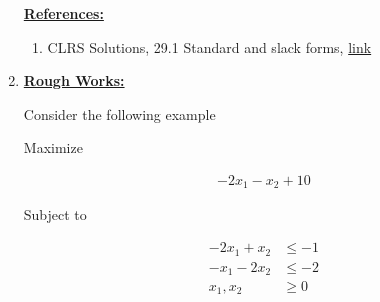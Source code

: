 \documentclass[12pt]{article}
\begin{document}
\begin{enumerate}[1.]





    \underline{\textbf{References:}}

    \bigskip

    \begin{enumerate}[1)]
        \item CLRS Solutions, 29.1 Standard and slack forms, \href{https://walkccc.github.io/CLRS/Chap29/29.1/}{link}
    \end{enumerate}

    \item

    \underline{\textbf{Rough Works:}}

    \bigskip

    Consider the following example

    \bigskip

    Maximize

    \begin{align*}
        -2x_1 - x_2 + 10
    \end{align*}

    Subject to

    \begin{align*}
        -2x_1 + x_2 &\leq -1\\
        -x_1 - 2x_2 &\leq -2\\
        x_1,x_2 &\geq 0
    \end{align*}

\end{enumerate}
\end{document}

